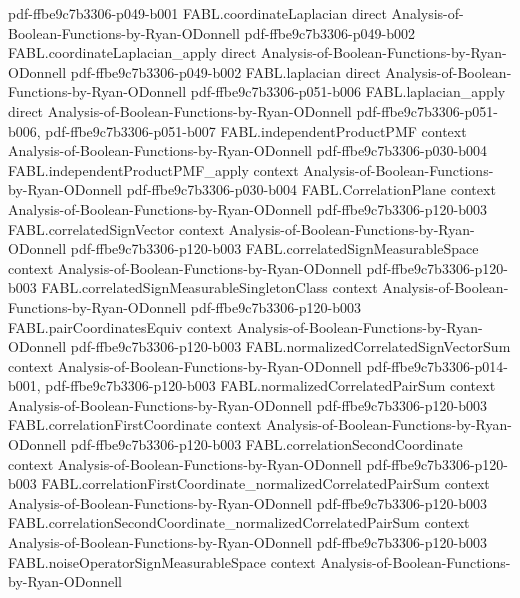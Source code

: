 \begin{theorem}
  {pdf-ffbe9c7b3306-p049-b001}
\proofstep
  {FABL.coordinateLaplacian}
  {direct}
  {Analysis-of-Boolean-Functions-by-Ryan-ODonnell}
  {pdf-ffbe9c7b3306-p049-b002}
\proofstep
  {FABL.coordinateLaplacian_apply}
  {direct}
  {Analysis-of-Boolean-Functions-by-Ryan-ODonnell}
  {pdf-ffbe9c7b3306-p049-b002}
\proofstep
  {FABL.laplacian}
  {direct}
  {Analysis-of-Boolean-Functions-by-Ryan-ODonnell}
  {pdf-ffbe9c7b3306-p051-b006}
\proofstep
  {FABL.laplacian_apply}
  {direct}
  {Analysis-of-Boolean-Functions-by-Ryan-ODonnell}
  {pdf-ffbe9c7b3306-p051-b006,
    pdf-ffbe9c7b3306-p051-b007}
\proofstep
  {FABL.independentProductPMF}
  {context}
  {Analysis-of-Boolean-Functions-by-Ryan-ODonnell}
  {pdf-ffbe9c7b3306-p030-b004}
\proofstep
  {FABL.independentProductPMF_apply}
  {context}
  {Analysis-of-Boolean-Functions-by-Ryan-ODonnell}
  {pdf-ffbe9c7b3306-p030-b004}
\proofstep
  {FABL.CorrelationPlane}
  {context}
  {Analysis-of-Boolean-Functions-by-Ryan-ODonnell}
  {pdf-ffbe9c7b3306-p120-b003}
\proofstep
  {FABL.correlatedSignVector}
  {context}
  {Analysis-of-Boolean-Functions-by-Ryan-ODonnell}
  {pdf-ffbe9c7b3306-p120-b003}
\proofstep
  {FABL.correlatedSignMeasurableSpace}
  {context}
  {Analysis-of-Boolean-Functions-by-Ryan-ODonnell}
  {pdf-ffbe9c7b3306-p120-b003}
\proofstep
  {FABL.correlatedSignMeasurableSingletonClass}
  {context}
  {Analysis-of-Boolean-Functions-by-Ryan-ODonnell}
  {pdf-ffbe9c7b3306-p120-b003}
\proofstep
  {FABL.pairCoordinatesEquiv}
  {context}
  {Analysis-of-Boolean-Functions-by-Ryan-ODonnell}
  {pdf-ffbe9c7b3306-p120-b003}
\proofstep
  {FABL.normalizedCorrelatedSignVectorSum}
  {context}
  {Analysis-of-Boolean-Functions-by-Ryan-ODonnell}
  {pdf-ffbe9c7b3306-p014-b001,
    pdf-ffbe9c7b3306-p120-b003}
\proofstep
  {FABL.normalizedCorrelatedPairSum}
  {context}
  {Analysis-of-Boolean-Functions-by-Ryan-ODonnell}
  {pdf-ffbe9c7b3306-p120-b003}
\proofstep
  {FABL.correlationFirstCoordinate}
  {context}
  {Analysis-of-Boolean-Functions-by-Ryan-ODonnell}
  {pdf-ffbe9c7b3306-p120-b003}
\proofstep
  {FABL.correlationSecondCoordinate}
  {context}
  {Analysis-of-Boolean-Functions-by-Ryan-ODonnell}
  {pdf-ffbe9c7b3306-p120-b003}
\proofstep
  {FABL.correlationFirstCoordinate_normalizedCorrelatedPairSum}
  {context}
  {Analysis-of-Boolean-Functions-by-Ryan-ODonnell}
  {pdf-ffbe9c7b3306-p120-b003}
\proofstep
  {FABL.correlationSecondCoordinate_normalizedCorrelatedPairSum}
  {context}
  {Analysis-of-Boolean-Functions-by-Ryan-ODonnell}
  {pdf-ffbe9c7b3306-p120-b003}
\proofstep
  {FABL.noiseOperatorSignMeasurableSpace}
  {context}
  {Analysis-of-Boolean-Functions-by-Ryan-ODonnell}

\end{theorem}
